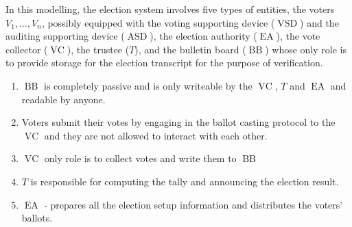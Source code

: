 \documentclass[12pt]{article}
\DeclareMathOperator{\vsd}{VSD}
\DeclareMathOperator{\asd}{ASD}
\DeclareMathOperator{\ea}{EA}
\DeclareMathOperator{\bb}{BB}
\DeclareMathOperator{\voc}{VC}
\begin{document}
In this modelling, the election system involves five types of entities, the voters $V_1, \dots , V_n$, possibly equipped with the voting supporting device ($\vsd$) and the auditing supporting device ($\asd$), the election authority ($\ea$), the vote collector ($\voc$), the trustee ($T$), and the bulletin board ($\bb$) whose only role is to provide storage for the election transcript for the purpose of verification. 
\begin{enumerate}
\item $\bb$ is completely passive and is only writeable by the $\voc$, $T$ and $\ea$ and readable by anyone. 
\item Voters submit their votes by engaging in the ballot casting protocol to the $\voc$ and they are not allowed to interact with each other. 
\item $\voc$ only role is to collect votes and write them to $\bb$
\item $T$ is responsible for computing the tally and announcing the election result.
\item $\ea$ - prepares all the election setup information and distributes the voters' ballots.
\end{enumerate}
\end{document}
